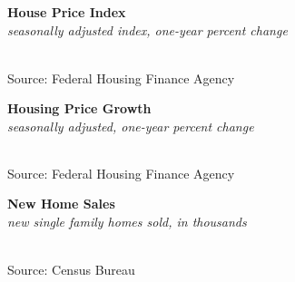 \documentclass{report}
\makeatletter
\newcommand{\tbllink}[1]{\href{https://raw.githubusercontent.com/bdecon/US-chartbook/master/chartbook/data/#1}{\faTable}}
\newcommand*\short[1]{\expandafter\@gobbletwo\number\numexpr#1\relax}
\newcommand{\dateaxisticks}{
		date coordinates in=x, axis line style={draw=none},
		xmax={2021-05-15},
		max space between ticks=40,	    
		xtick={{1990-01-01}, {1992-01-01}, {1994-01-01}, 
			{1996-01-01}, {1998-01-01}, {2000-01-01}, 
			{2002-01-01}, {2004-01-01}, {2006-01-01},
			{2008-01-01}, {2010-01-01}, {2012-01-01}, {2014-01-01},
		    {2016-01-01}, {2018-01-01}, {2020-01-01}},
		minor xtick={{1989-01-01}, {1991-01-01}, {1993-01-01},
			{1995-01-01}, {1997-01-01}, {1999-01-01}, 
			{2001-01-01}, {2003-01-01}, {2005-01-01}, {2007-01-01},
		    {2009-01-01}, {2011-01-01}, {2013-01-01}, {2015-01-01},
		    {2017-01-01}, {2019-01-01}, {2021-01-01}},
		enlarge y limits={0.06}, enlarge x limits={0.01},
		}
\newcommand{\bbar}[2]{extra #1 ticks = {{#2}}, extra #1 tick labels = ,
		extra #1 tick style = {grid=major, grid style={thick, black!25}},}
\newcommand{\stdline}[4]{\addplot[very thick, no markers, color=#1] 
		table [x=#2, y=#3, col sep=comma] {#4};	}
\newcommand{\thickline}[4]{\addplot[ultra thick, no markers, color=#1] 
		table [x=#2, y=#3, col sep=comma] {#4};	}
\newcommand{\rbars}{
		\fill[color=black!10] (axis cs:{1990-07-01},\pgfkeysvalueof{/pgfplots/ymin}) rectangle 
			(axis cs:{1991-03-01}, \pgfkeysvalueof{/pgfplots/ymax});
		\fill[color=black!10] (axis cs:{2007-12-01},\pgfkeysvalueof{/pgfplots/ymin}) rectangle 
			(axis cs:{2009-07-01}, \pgfkeysvalueof{/pgfplots/ymax});
		\fill[color=black!10] (axis cs:{2001-03-01},\pgfkeysvalueof{/pgfplots/ymin}) rectangle 
			(axis cs:{2001-11-01}, \pgfkeysvalueof{/pgfplots/ymax});
		\fill[color=black!10] (axis cs:{2020-02-01},\pgfkeysvalueof{/pgfplots/ymin}) rectangle 
			(axis cs:{2021-05-15}, \pgfkeysvalueof{/pgfplots/ymax});}
\newcommand{\rebars}{
		\fill[color=black!10] (axis cs:{2007-12-01},\pgfkeysvalueof{/pgfplots/ymin}) rectangle 
			(axis cs:{2009-07-01}, \pgfkeysvalueof{/pgfplots/ymax});
		\fill[color=black!10] (axis cs:{2001-03-01},\pgfkeysvalueof{/pgfplots/ymin}) rectangle 
			(axis cs:{2001-11-01}, \pgfkeysvalueof{/pgfplots/ymax});
		\fill[color=black!10] (axis cs:{2020-02-01},\pgfkeysvalueof{/pgfplots/ymin}) rectangle 
			(axis cs:{2021-05-15}, \pgfkeysvalueof{/pgfplots/ymax});}
\makeatother
\begin{document}
{\begin{minipage}{0.76\textwidth}
\normalsize \textbf{House Price Index}\\
\footnotesize{\textit{seasonally adjusted index, one-year percent change}}\\
\hspace*{-2mm} \\
\footnotesize{Source: Federal Housing Finance Agency} \hfill \tbllink{hpi.csv}
\vspace{2mm}

\normalsize{\textbf{Housing Price Growth}}\\
\footnotesize{\textit{seasonally adjusted, one-year percent change}}\\
\hspace*{-3mm} \noindent {} \setlength{\tabcolsep}{3.1pt} \color{black!90}
		{\renewcommand{\arraystretch}{1.5}
		 \begin{tabular}{p{24mm} R{7.1mm} R{7.1mm} R{7.1mm} R{7.1mm} R{7.1mm} R{7.1mm} R{7.1mm} R{12.0mm} R{10.8mm}}
			  \hline
		\end{tabular}}
		
	\vspace{-2mm}
\footnotesize{Source: Federal Housing Finance Agency} \hfill \tbllink{hpi.csv}
\vspace{5mm}

\small 
\vspace{1mm}

\normalsize{\textbf{New Home Sales}}\\
\footnotesize{\textit{new single family homes sold, in thousands}}\\
\hspace*{-2mm} \\
\footnotesize{Source: Census Bureau} \hfill \tbllink{nhs.csv}
\end{minipage}
\newpage
}
\end{document}
